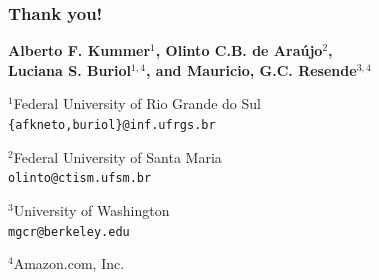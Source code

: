 \documentclass[aspectratio=169]{beamer}
\begin{document}
\begin{frame}
   \frametitle{Thank you!}
   \begin{center}
      \footnotesize
      \textbf{Alberto F. Kummer$^1$, Olinto C.B. de Araújo$^2$,\\Luciana S. Buriol$^{1,4}$, and Mauricio, G.C. Resende$^{3,4}$}

      \vspace*{8pt}

      $^1$Federal University of Rio Grande do Sul\\
      \texttt{\{\textcolor{InfRed}{afkneto},buriol\}@inf.ufrgs.br}
      \vspace*{6pt}

      $^2$Federal University of Santa Maria\\
      \texttt{olinto@ctism.ufsm.br}
      \vspace*{6pt}

      $^3$University of Washington\\
      \texttt{mgcr@berkeley.edu}
      \vspace*{6pt}

      $^4$Amazon.com, Inc.
   \end{center}


\end{frame}
\end{document}
